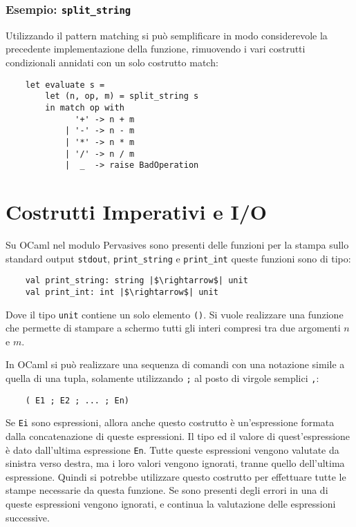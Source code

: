\documentclass{article}
\numberwithin{equation}{subsection}
\begin{document}
\subsubsection{Esempio: \texttt{split\_string}}

Utilizzando il pattern matching si può semplificare in modo considerevole la precedente implementazione della funzione, rimuovendo i vari costrutti condizionali annidati con un solo costrutto match:
\begin{verbatim}
    let evaluate s = 
        let (n, op, m) = split_string s
        in match op with
              '+' -> n + m
            | '-' -> n - m
            | '*' -> n * m
            | '/' -> n / m
            |  _  -> raise BadOperation    
\end{verbatim}

\clearpage

\section{Costrutti Imperativi e I/O}

Su OCaml nel modulo Pervasives sono presenti delle funzioni per la stampa sullo standard output \verb|stdout|, \verb|print_string| e \verb|print_int| queste funzioni sono di tipo: 
\begin{verbatim}
    val print_string: string |$\rightarrow$| unit
    val print_int: int |$\rightarrow$| unit
\end{verbatim}
Dove il tipo \verb|unit| contiene un solo elemento \verb|()|. Si vuole realizzare una funzione che permette di stampare a schermo tutti gli interi compresi tra due argomenti $n$ e $m$. 


In OCaml si può realizzare una sequenza di comandi con una notazione simile a quella di una tupla, solamente utilizzando \verb|;| al posto di virgole semplici \verb|,|:
\begin{verbatim}
    ( E1 ; E2 ; ... ; En)
\end{verbatim}
Se \verb|Ei| sono espressioni, allora anche questo costrutto è un'espressione formata dalla concatenazione di queste espressioni. Il tipo ed il valore di quest'espressione è dato dall'ultima espressione \verb|En|. Tutte queste espressioni vengono valutate da sinistra verso destra, ma i loro valori vengono ignorati, tranne quello dell'ultima espressione. 
Quindi si potrebbe utilizzare questo costrutto per effettuare tutte le stampe necessarie da questa funzione. 
Se sono presenti degli errori in una di queste espressioni vengono ignorati, e continua la valutazione delle espressioni successive. 
\end{document}
